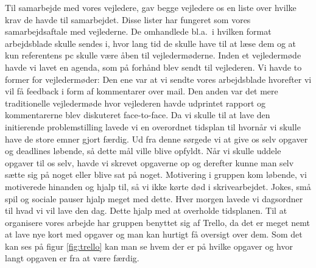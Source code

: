 \documentclass[oneside,a4paper,titlepage]{article}
\begin{document}
Til samarbejde med vores vejledere, gav begge vejledere os en liste over hvilke krav de havde til samarbejdet. Disse lister har fungeret som vores samarbejdsaftale med vejlederne. De omhandlede bl.a.\ i hvilken format arbejdsblade skulle sendes i, hvor lang tid de skulle have til at læse dem og at kun referentens pc skulle være åben til vejledermøderne. Inden et vejledermøde havde vi lavet en agenda, som på forhånd blev sendt til vejlederen. Vi havde to former for vejledermøder: Den ene var at vi sendte vores arbejdsblade hvorefter vi vil få feedback i form af kommentarer over mail. Den anden var det mere traditionelle vejledermøde hvor vejlederen havde udprintet rapport og kommentarerne blev diskuteret face-to-face. \newline\newline
Da vi skulle til at lave den initierende problemstilling lavede vi en overordnet tidsplan til hvornår vi skulle have de store emner gjort færdig. Ud fra denne sørgede vi at give os selv opgaver og deadlines løbende, så dette mål ville blive opfyldt. \newline
Når vi skulle uddele opgaver til os selv, havde vi skrevet opgaverne op og derefter kunne man selv sætte sig på noget eller blive sat på noget. Motivering i gruppen kom løbende, vi motiverede hinanden og hjalp til, så vi ikke kørte død i skrivearbejdet. Jokes, små spil og sociale pauser hjalp meget med dette. 
Hver morgen lavede vi dagsordner til hvad vi vil lave den dag. Dette hjalp med at overholde tidsplanen. Til at organisere vores arbejde har gruppen benyttet sig af Trello, da det er meget nemt at lave nye kort med opgaver og man kan hurtigt få oversigt over dem. Som det kan ses på figur \ref{fig:trello} kan man se hvem der er på hvilke opgaver og hvor langt opgaven er fra at være færdig.
\end{document}
